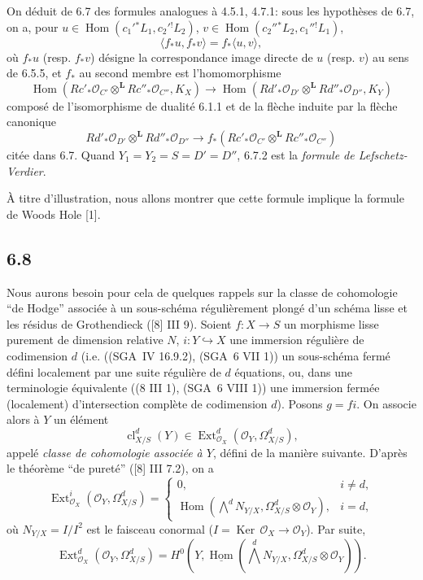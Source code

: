 \documentclass[11pt]{article}
\providecommand{\cO}{\mathcal{O}}
\DeclareMathOperator{\Hom}{Hom}
\DeclareMathOperator{\Ext}{Ext}
\providecommand{\Ker}{\operatorname{Ker}}
\providecommand{\cl}{\operatorname{cl}}
\providecommand{\Hom}{\operatorname{Hom}}
\providecommand{\Ker}{\operatorname{Ker}}
\providecommand{\Ker}{\operatorname{Ker}}
\providecommand{\cl}{\operatorname{cl}}
\begin{document}
On déduit de 6.7 des formules analogues à 4.5.1, 4.7.1: sous les hypothèses de 6.7, on a, pour $u\in\Hom(c_1'{}^*L_1,c_2'{}^!L_2)$, $v\in\Hom(c_2''{}^*L_2,c_1''{}^!L_1)$,
\begin{equation}
\tag{6.7.2}
\langle f_*u,f_*v\rangle=f_*\langle u,v\rangle,
\end{equation}
où $f_*u$ (resp. $f_*v$) désigne la correspondance image directe de $u$ (resp. $v$) au sens de 6.5.5, et $f_*$ au second membre est l'homomorphisme
\begin{equation}
\tag{6.7.3}
\Hom(Rc'_*\cO_{C'}\otimes^{\mathbf L}Rc''_*\cO_{C''},K_X)
\longrightarrow
\Hom(Rd'_*\cO_{D'}\otimes^{\mathbf L}Rd''_*\cO_{D''},K_Y)
\end{equation}
composé de l'isomorphisme de dualité 6.1.1 et de la flèche induite par la flèche canonique
\[
Rd'_*\cO_{D'}\otimes^{\mathbf L}Rd''_*\cO_{D''}\longrightarrow f_*(Rc'_*\cO_{C'}\otimes^{\mathbf L}Rc''_*\cO_{C''})
\]
citée dans 6.7. Quand $Y_1=Y_2=S=D'=D''$, 6.7.2 est la \emph{formule de Lefschetz-Verdier}.

À titre d'illustration, nous allons montrer que cette formule implique la formule de Woods Hole [1].

\subsection*{6.8}
Nous aurons besoin pour cela de quelques rappels sur la classe de cohomologie ``de Hodge'' associée à un sous-schéma régulièrement plongé d'un schéma lisse et les résidus de Grothendieck ([8] III 9). Soient $f:X\to S$ un morphisme lisse purement de dimension relative $N$, $i:Y\hookrightarrow X$ une immersion régulière de codimension $d$ (i.e. ((SGA~IV 16.9.2), (SGA~6 VII 1)) un sous-schéma fermé défini localement par une suite régulière de $d$ équations, ou, dans une terminologie équivalente ((8 III 1), (SGA~6 VIII 1)) une immersion fermée (localement) d'intersection complète de codimension $d$). Posons $g=fi$. On associe alors à $Y$ un élément
\begin{equation}
\tag{6.8.1}
\cl^d_{X/S}(Y)\in\Ext^d_{\cO_X}(\cO_Y,\Omega^d_{X/S}),
\end{equation}
appelé \emph{classe de cohomologie associée à $Y$}, défini de la manière suivante. D'après le théorème ``de pureté'' ([8] III 7.2), on a
\begin{equation}
\tag{6.8.2}
\Ext^i_{\cO_X}(\cO_Y,\Omega^d_{X/S})=
\begin{cases}
0,& i\ne d,\\
\Hom(\bigwedge^d N_{Y/X},\Omega^d_{X/S}\otimes\cO_Y),& i=d,
\end{cases}
\end{equation}
où $N_{Y/X}=I/I^2$ est le faisceau conormal ($I=\Ker\,\cO_X\to\cO_Y$). Par suite,
\begin{equation}
\tag{6.8.3}
\Ext^d_{\cO_X}(\cO_Y,\Omega^d_{X/S})=H^0(Y,\underline{\Hom}(\bigwedge^dN_{Y/X},\Omega^d_{X/S}\otimes\cO_Y)).
\end{equation}
\end{document}
